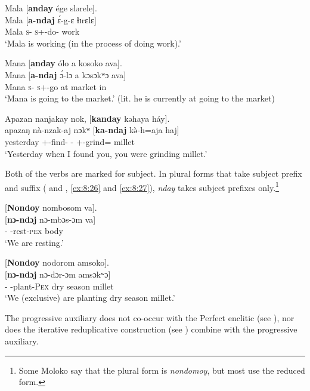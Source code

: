 \ea \label{ex:8:23}
Mala  [\textbf{anday} ége  slərele].\\
\gll  Mala [\textbf{a-ndaj}  \'{ɛ}{}-g-ɛ  ɬɪrɛlɛ]\\
      Mala   \textsc{s}-{\PRG}    \textsc{s}+{\IFV}-do-{\CL}  work\\
\glt  ‘Mala is working (in the process of doing work).’
\z

\ea \label{ex:8:24}
Mana [\textbf{anday} ólo  a  kosoko  ava].\\
\gll Mana [\textbf{a-ndaj} \'{ɔ}{}-lɔ a kɔsɔkʷɔ ava]\\
Mana  \textsc{s}-{\PRG}    \textsc{s}+{\IFV}{}-go  at  market  in\\
\glt ‘Mana is going to the market.’  (lit. he is currently at going to the market)
\z

\ea \label{ex:8:25} 
Apazan  nanjakay  nok, [\textbf{kanday} kəhaya  háy].\\
\gll apazaŋ nà-nzak-aj nɔkʷ [\textbf{ka-ndaj} k\`{ə}-h=aja haj]\\
yesterday  {\oneS}+{\PFV}-find{}-{\CL}  {\twoS}  {\twoS}-{\PRG}    {\twoS}+{\PFV}-grind={\PLU}  millet\\
\glt ‘Yesterday when I found you, you were grinding millet.’  
\z

Both of the verbs are marked for subject. In plural forms that take subject prefix and suffix ({\oneP} and {\twoP}, \ref{ex:8:26} and \ref{ex:8:27}), \textit{nday} takes subject prefixes only.\footnote{Some Moloko say that the plural form is \textit{nondomoy}, but most use the reduced form. } 

\ea \label{ex:8:26}
{}[\textbf{Nondoy} nombosom  va].\\
\gll  {}[\textbf{nɔ-ndɔj}  nɔ-mbɔs-ɔm   va]\\
      {\oneS}-{\PRG}    \oneP-rest-\textsc{pex}  body\\
\glt  ‘We are resting.’ 
\z

\ea \label{ex:8:27}
{}[\textbf{Nondoy}  nodorom amsoko].\\
\gll  {}[\textbf{nɔ-ndɔj}     nɔ-dɔr-ɔm amsɔkʷɔ]\\
      {\oneS}-{\PRG}    \oneP-plant-\textsc{Pex}  {dry season millet}\\
\glt  ‘We (exclusive) are planting dry season millet.’
\z

The progressive auxiliary does not co-occur with the Perfect enclitic (see ), nor does the iterative reduplicative construction (see ) combine with the progressive auxiliary.


